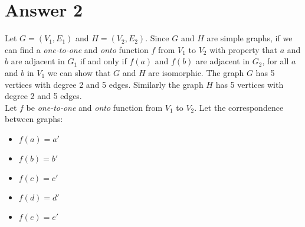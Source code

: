 \documentclass[12pt]{article}
\begin{document}
\section*{Answer 2}

Let $G = (V_1, E_1)$ and $H = (V_2, E_2)$. Since $G$ and $H$ are simple graphs, if we can find a \emph{one-to-one} and \emph{onto} function $f$ from $V_1$ to $V_2$ with property that $a$ and $b$ are adjacent in $G_1$ if and only if $f(a)$ and $f(b)$ are adjacent in $G_2$, for all $a$ and $b$ in $V_1$ we can show that $G$ and $H$ are isomorphic. The graph $G$ has 5 vertices with degree 2 and 5 edges. Similarly the graph $H$ has 5 vertices with degree 2 and 5 edges. \\


Let $f$ be \emph{one-to-one} and \emph{onto} function from $V_1$ to $V_2$. Let the correspondence between graphs:
\begin{itemize}
    \item $f(a) = a'$
    \item $f(b) = b'$
    \item $f(c) = c'$
    \item $f(d) = d'$
    \item $f(e) = e'$
\end{itemize}
\end{document}
